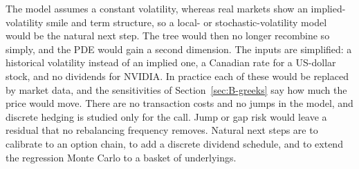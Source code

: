 The model assumes a constant volatility, whereas real markets show an implied-volatility smile and term structure, so a local- or stochastic-volatility model would be the natural next step.
The tree would then no longer recombine so simply, and the PDE would gain a second dimension.
The inputs are simplified: a historical volatility instead of an implied one, a Canadian rate for a US-dollar stock, and no dividends for NVIDIA.
In practice each of these would be replaced by market data, and the sensitivities of Section~\ref{sec:B-greeks} say how much the price would move.
There are no transaction costs and no jumps in the model, and discrete hedging is studied only for the call.
Jump or gap risk would leave a residual that no rebalancing frequency removes.
Natural next steps are to calibrate to an option chain, to add a discrete dividend schedule, and to extend the regression Monte Carlo to a basket of underlyings.
